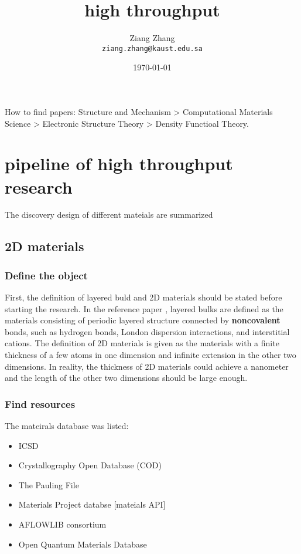 \documentclass[a4paper, 11pt]{article}
\title{high throughput}
\author{Ziang Zhang \\ \texttt{ziang.zhang@kaust.edu.sa}}
\date{\today}
\numberwithin{equation}{subsection}
\begin{document}
\maketitle
\tableofcontents

How to find papers: Structure and Mechanism > Computational Materials Science > Electronic Structure Theory > Density Functioal Theory.

\section{pipeline of high throughput research}

The discovery design of different mateials are summarized

\subsection{2D materials}

\subsubsection{Define the object} First, the definition of layered buld and 2D materials should be stated before starting the research. In the reference paper \cite{zhang_high-throughput_2019-1}, layered bulks are defined as the materials consisting of periodic layered structure connected by \textbf{noncovalent} bonds, such as hydrogen bonds, London dispersion interactions, and interstitial cations. The definition of 2D materials is given as the materials with a finite thickness of a few atoms in one dimension and infinite extension in the other two dimensions. In reality, the thickness of 2D materials could achieve a nanometer and the length of the other two dimensions should be large enough.

\subsubsection{Find resources} The mateirals database was listed:

\begin{itemize}
  \item ICSD
  \item Crystallography Open Database (COD)
  \item The Pauling File
  \item Materials Project databse [mateials API]
  \item AFLOWLIB consortium
  \item Open Quantum Materials Database
\end{itemize}
\end{document}
